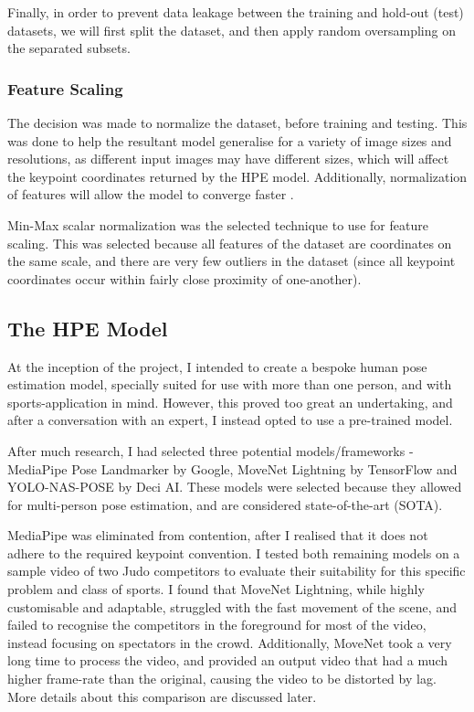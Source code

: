 \documentclass[a4paper, oneside, 11pt]{article}
\begin{document}
\bigskip
\noindent
Finally, in order to prevent data leakage between the training and hold-out (test) datasets, we will first split the dataset, and then apply random oversampling on the separated subsets.

\subsubsection{Feature Scaling}

The decision was made to normalize the dataset, before training and testing. This was done to help the resultant model generalise for a variety of image sizes and resolutions, as different input images may have different sizes, which will affect the keypoint coordinates returned by the HPE model. Additionally, normalization of features will allow the model to converge faster \cite{FeatureScaling}.

\bigskip
\noindent
Min-Max scalar normalization was the selected technique to use for feature scaling. This was selected because all features of the dataset are coordinates on the same scale, and there are very few outliers in the dataset (since all keypoint coordinates occur within fairly close proximity of one-another).

\subsection{The HPE Model}

At the inception of the project, I intended to create a bespoke human pose estimation model, specially suited for use with more than one person, and with sports-application in mind. However, this proved too great an undertaking, and after a conversation with an expert, I instead opted to use a pre-trained model.

\bigskip
\noindent
After much research, I had selected three potential models/frameworks - MediaPipe Pose Landmarker by Google, MoveNet Lightning by TensorFlow and YOLO-NAS-POSE by Deci AI. These models were selected because they allowed for multi-person pose estimation, and are considered state-of-the-art (SOTA). 

\bigskip
\noindent
MediaPipe was eliminated from contention, after I realised that it does not adhere to the required keypoint convention. I tested both remaining models on a sample video of two Judo competitors to evaluate their suitability for this specific problem and class of sports. I found that MoveNet Lightning, while highly customisable and adaptable, struggled with the fast movement of the scene, and failed to recognise the competitors in the foreground for most of the video, instead focusing on spectators in the crowd. Additionally, MoveNet took a very long time to process the video, and provided an output video that had a much higher frame-rate than the original, causing the video to be distorted by lag. More details about this comparison are discussed later.
\end{document}
